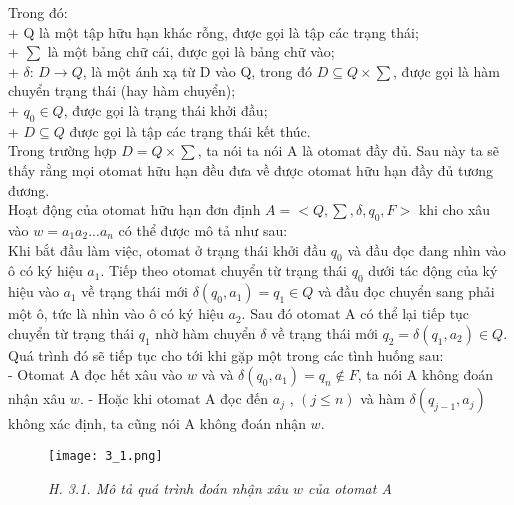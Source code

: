 \begin{flushleft}
Trong đó: \\
+ Q là một tập hữu hạn khác rỗng, được gọi là tập các trạng thái;\\
+ $\sum$ là một bảng chữ cái, được gọi là bảng chữ vào;\\
+ $\delta$: $D \to Q$, là một ánh xạ từ D vào Q, trong đó $D \subseteq Q \times \sum$, được gọi là hàm chuyển trạng thái (hay hàm chuyển);\\
+ $q_0 \in Q$, được gọi là trạng thái khởi đầu;\\
+ $D \subseteq Q$ được gọi là tập các trạng thái kết thúc.\\
\hspace{10mm}Trong trường hợp $D = Q \times \sum$, ta nói  ta nói A là otomat đầy đủ. Sau này ta sẽ thấy rằng mọi otomat hữu hạn đều đưa về được otomat hữu hạn đầy đủ tương đương.\\
Hoạt động của otomat hữu hạn đơn định $A = <Q, \sum, \delta, q_0, F>$ khi cho xâu vào $w = a_1a_2...a_n$ có thể được mô tả như sau:\\
\hspace{10mm}Khi bắt đầu làm việc, otomat ở trạng thái khởi đầu $q_0$ và đầu đọc đang nhìn vào ô có ký hiệu $a_1$. Tiếp theo otomat chuyển từ trạng thái $q_0$ dưới tác động của ký hiệu vào $a_1$ về trạng thái mới $\delta(q_0, a_1) = q_1 \in Q$ và đầu đọc chuyển sang phải một ô, tức là nhìn vào ô có ký hiệu $a_2$. Sau đó otomat A có thể lại tiếp tục chuyển từ trạng thái $q_1$ nhờ hàm chuyển $\delta$ về trạng thái mới $q_2 = \delta(q_1, a_2) \in Q$. Quá trình đó sẽ tiếp tục cho tới khi gặp một trong các tình huống sau:\\
- Otomat A đọc hết xâu vào $w$ và  và $\delta(q_0, a_1) = q_n \not \in F$, ta nói A không đoán nhận xâu $w$.
- Hoặc khi otomat A đọc đến $a_j$ , $(j \le n)$ và hàm $\delta(q_{j-1}, a_j)$ không xác định, ta cũng nói A không đoán nhận $w$.
\end{flushleft}
\begin{center}
\begin{figure}[ht]
\texttt{[image: 3\_1.png]}
\caption{ \textit{H. 3.1. Mô tả quá trình đoán nhận xâu $w$ của otomat A} }
\end{figure}
\end{center}

